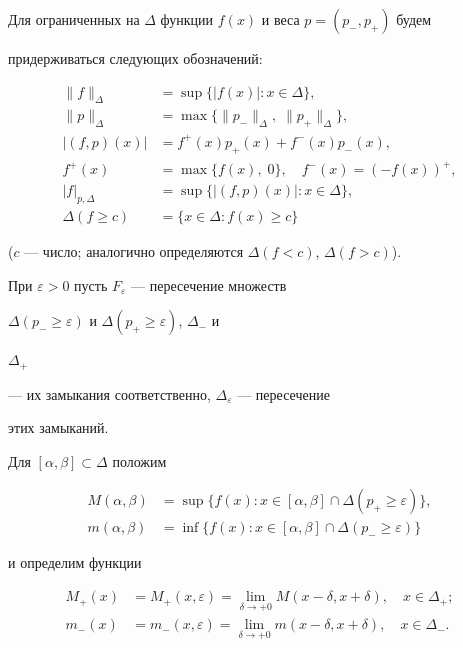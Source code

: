 Для ограниченных на $\Delta$ функции $f(x)$ и веса $p=(p_-,p_+)$ будем


придерживаться следующих обозначений:


\begin{align*}


\|f\|_\Delta&=\sup\{|f(x)|:x\in\Delta\},\\


\|p\|_\Delta&=\max\{\|p_-\|_\Delta,\;\|p_+\|_\Delta\},\\


|(f,p)(x)|&=f^+(x)p_+(x)+f^-(x)p_-(x),\\


f^+(x)&=\max\{f(x),\;0\},\quad f^-(x)=(-f(x))^+,\\


|f|_{p,\Delta}&=\sup\{|(f,p)(x)|:x\in\Delta\},\\


\Delta(f\ge c)&=\{x\in\Delta:f(x)\ge c\}


\end{align*}


($c$ --- число; аналогично определяются $\Delta(f<c)$, $\Delta(f>c)$).





При $\varepsilon>0$ пусть $F_\varepsilon$ --- пересечение множеств


$\Delta(p_-\ge\varepsilon)$ и $\Delta(p_+\ge\varepsilon)$, $\Delta_-$ и


$\Delta_+$


--- их замыкания соответственно, $\Delta_\varepsilon$ --- пересечение


этих замыканий.


Для $[\alpha,\beta]\subset\Delta$ положим


\begin{align*}


M(\alpha,\beta)&=\sup\{f(x):x\in[\alpha,\beta]\cap\Delta


(p_+\ge\varepsilon)\},\\


m(\alpha,\beta)&=\inf\{f(x):x\in[\alpha,\beta]\cap\Delta


(p_-\ge\varepsilon)\}


\end{align*}


и определим функции


\begin{align*}


M_+(x)&=M_+(x,\varepsilon)=\lim_{\delta\to+0}


M(x-\delta,x+\delta),\quad x\in\Delta_+;\\


m_-(x)&=m_-(x,\varepsilon)=\lim_{\delta\to+0}


m(x-\delta,x+\delta),\quad x\in\Delta_-.


\end{align*}



